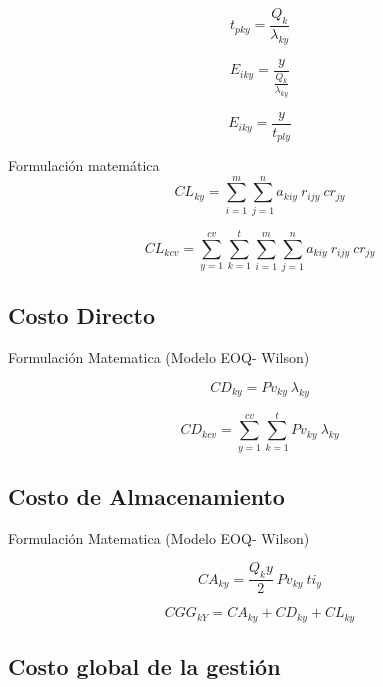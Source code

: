 \documentclass[]{article}
\begin{document}
\begin{equation}
    t_{pky} = \frac{Q_k}{\lambda_{ky}}
\end{equation}

\begin{equation}
     E_{iky} = \frac{y}{\frac{Q_k}{\lambda_{ky}}}
\end{equation}



\begin{equation}
    E_{iky} = \frac{y}{t_{ply}}
\end{equation}

Formulación matemática
\begin{equation}
    CL_{ky} = \sum_{i=1}^{m}\sum_{j=1}^{n} a_{kiy} \ \! r_{ijy}\ \! cr_{jy}
\end{equation}

\begin{equation}
    CL_{kcv} = \sum_{y=1}^{cv}\sum_{k=1}^{t}\sum_{i=1}^{m}\sum_{j=1}^{n} a_{kiy} \ \! r_{ijy}\ \! cr_{jy}
\end{equation}

\subsection{Costo Directo }


Formulación Matematica (Modelo EOQ- Wilson)

\begin{equation}
    CD_{ky} = Pv_{ky} \ \! \lambda_{ky}
\end{equation}

\begin{equation}
    CD_{kcv} = \sum_{y=1}^{cv}\sum_{k=1}^{t} Pv_{ky} \ \! \lambda_{ky}
\end{equation}
\subsection{Costo de Almacenamiento}


Formulación Matematica (Modelo EOQ- Wilson)

\begin{equation}
    CA_{ky} = \frac{Q_ky}{2} \ \! Pv_{ky} \ \! ti_{y}
\end{equation}

\begin{equation}
    CGG_{kY} = CA_{ky} + CD_{ky} + CL_{ky}
\end{equation}

\subsection{Costo global de la gestión}
\end{document}
